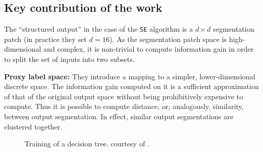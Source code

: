 \subsection{Key contribution of the work}
The ``structured output'' in the case of the {\tt SE} algorithm is a $d\times d$ segmentation patch (in practice they set $d = 16$). 
As the segmentation patch space is high-dimensional and complex, it is non-trivial to compute information gain in order to split the set of inputs into two subsets.

\textbf{Proxy label space:} They introduce a mapping to a simpler, lower-dimensional discrete space. The information gain computed on it is a sufficient approximation of that of the original output space without being prohibitively expensive to compute. Thus it is possible to compute distance, or, analogously, similarity, between output segmentation. In effect, similar output segmentations are clustered together.

\begin{figure}[ht!]
\centering
\caption[Training of a structured decision tree]{Training of a decision tree. \protect{} courtesy of \cite{DollarICCV13PresentationSlides}.}
\label{fig:srf-training}
\end{figure}


